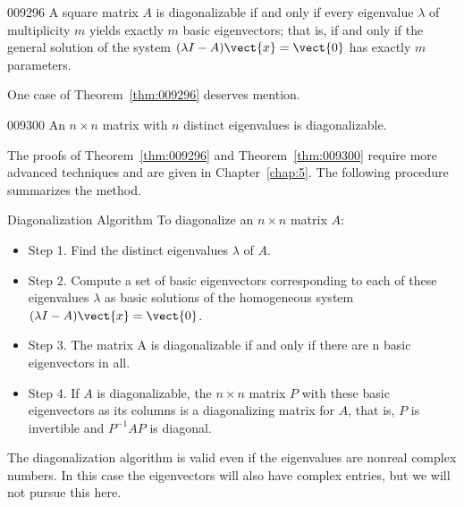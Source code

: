 \begin{theorem}{}{009296}
A  square matrix $A$ is diagonalizable if and only if every eigenvalue $\lambda$ of 
multiplicity $m$ yields exactly $m$ basic eigenvectors; that is, if and only
 if the general solution of the system $(\lambda I - A)\vect{x} = \vect{0}$ has exactly $m$ parameters.
\end{theorem}

\noindent One case of Theorem~\ref{thm:009296} deserves mention.


\begin{theorem}{}{009300}
An $n \times n$ matrix with $n$ distinct eigenvalues is diagonalizable.
\end{theorem}

\noindent The proofs of Theorem~\ref{thm:009296} and Theorem~\ref{thm:009300} require more advanced techniques and are given in Chapter~\ref{chap:5}. The following procedure summarizes the method.

\begin{theorem*}[label=thm:009304]{Diagonalization Algorithm}
To diagonalize an $n \times n$ matrix $A$:


\begin{itemize}[leftmargin=1em]
\item[] Step 1. Find the distinct eigenvalues $\lambda$ of $A$.

\item[] Step 2. Compute a set of basic eigenvectors corresponding to each of these 
eigenvalues $\lambda$ as basic solutions of the homogeneous system $(\lambda I - A)\vect{x} = \vect{0}$.

\item[] Step 3. The matrix A is diagonalizable if and only if there are n basic eigenvectors in all.

\item[] Step 4. If $A$ is diagonalizable, the $n \times n$ matrix $P$ with these basic 
eigenvectors as its columns is a diagonalizing matrix for $A$, that is, $P$ 
is invertible and $P^{-1}AP$ is diagonal.
\end{itemize}
\end{theorem*}

\noindent The diagonalization algorithm is valid even if the eigenvalues are nonreal 
complex numbers. In this case the eigenvectors will also have complex 
entries, but we will not pursue this here.


